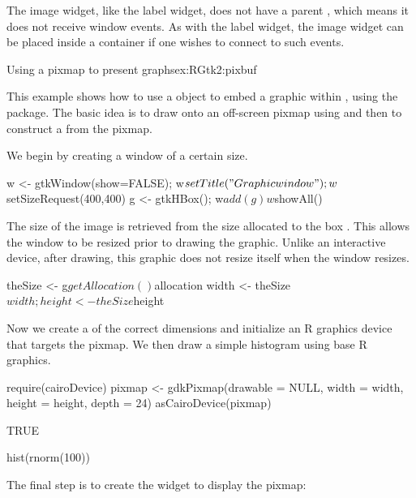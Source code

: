The image widget, like the label widget, does not have a parent
, which means it does not receive window events. As
with the label widget, the image widget can be placed inside a
 container if one wishes to connect to such
events.


\begin{example}{Using a pixmap to present graphs}{ex:RGtk2:pixbuf}





  This example shows how to use a  object to
  embed a graphic within , using the
   package. The basic idea is to draw onto an
  off-screen pixmap using  and
  then to construct a  from the pixmap. 

  We begin by creating a window of a certain size.
\begin{Schunk}
\begin{Sinput}
 w <- gtkWindow(show=FALSE); w$setTitle("Graphic window");
 w$setSizeRequest(400,400)
 g <- gtkHBox(); w$add(g)
 w$showAll()
\end{Sinput}
\end{Schunk}


The size of the image is retrieved from the size allocated to the box
. This allows the window to be resized prior to drawing the
graphic. Unlike an interactive device, after drawing, this graphic
does not resize itself when the window resizes.

\begin{Schunk}
\begin{Sinput}
 theSize <- g$getAllocation()$allocation
 width <- theSize$width; height <- theSize$height
\end{Sinput}
\end{Schunk}

Now we create a  of the correct dimensions and
initialize an R graphics device that targets the pixmap. We then draw
a simple histogram using base R graphics.
\begin{Schunk}
\begin{Sinput}
 require(cairoDevice)
 pixmap <- gdkPixmap(drawable = NULL, 
                     width = width, height = height, depth = 24)
 asCairoDevice(pixmap)
\end{Sinput}
\begin{Soutput}
[1] TRUE
\end{Soutput}
\begin{Sinput}
 hist(rnorm(100))
\end{Sinput}
\end{Schunk}

The final step is to create the  widget to display the
pixmap: 
\begin{Schunk}
\end{Schunk}

\end{example}


